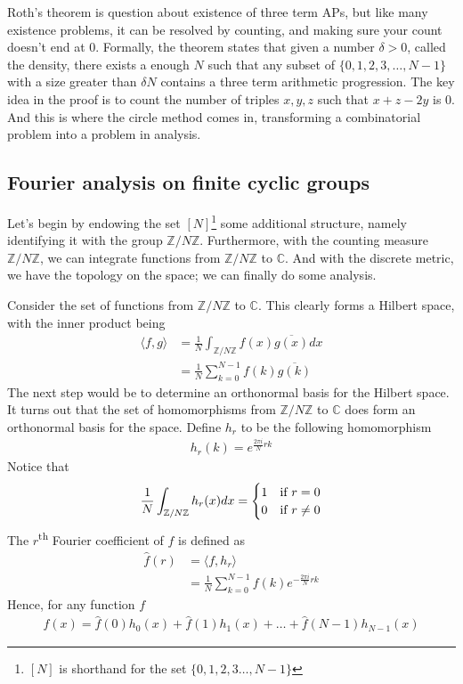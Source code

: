 \documentclass[12pt, titlepage]{article}
\theoremstyle{definition}
\newcommand{\znz}{\mathbb{Z}/N\mathbb{Z}}
\newcommand{\iprod}[2]{\langle #1, #2 \rangle}
\begin{document}
Roth's theorem is question about existence of three term APs, but like many existence problems, it can be resolved by counting, and making sure your count doesn't end at $0$. Formally, the theorem states that given a number $\delta > 0$, called the density, there exists a enough $N$ such that any subset of $\{0,1, 2, 3, \ldots, N-1\}$ with a size greater than $\delta N$ contains a  three term arithmetic progression.  The key idea in the proof is to count the number of triples $x,y,z$ such that $x+z-2y$ is $0$. And this is where the circle method comes in, transforming a combinatorial problem into a problem in analysis.

\subsection{Fourier analysis on finite cyclic groups}
Let's begin by endowing the set $[N]$\footnote{$[N]$ is shorthand for the set $\{0,1, 2,3 \ldots, N-1\}$} some additional structure, namely identifying it with the group $\znz$. Furthermore, with the counting measure $\znz$, we can integrate functions from $\znz$ to $\mathbb{C}$. And with the discrete metric, we have the topology on the space; we can finally do some analysis.

Consider the set of functions from $\znz$ to $\mathbb{C}$. This clearly forms a Hilbert space, with the inner product being
\begin{align*}
   \iprod{f}{g} &= \frac{1}{N} \int_{\znz} f(x) \overline{g(x)} dx \\
   &= \frac{1}{N} \sum_{k=0}^{N-1} f(k) \overline{g(k)}
\end{align*}
The next step would be to determine an orthonormal basis for the Hilbert space. It turns out that the set of homomorphisms from $\znz$ to $\mathbb{C}$ does form an orthonormal basis for the space. Define $h_r$ to be the following homomorphism
\begin{align*}
    h_r(k) = e^{\frac{2\pi i}{N}rk}
\end{align*}
Notice that
\begin{align*}
    \frac{1}{N}\int_{\znz} h_r(x) dx =
    \begin{cases}
        1 \hfill &\text{if $r=0$} \\
        0 \hfill &\text{if $r \neq 0$}
    \end{cases}
\end{align*}
The $r$\textsuperscript{th} Fourier coefficient of $f$ is defined as
\begin{align*}
    \widehat{f}(r) &= \iprod{f}{h_r}\\ 
    &= \frac{1}{N} \sum_{k=0}^{N-1} f(k) e^{-\frac{2\pi i}{N}rk} 
\end{align*}
Hence, for any function $f$
\begin{align*}
    f(x) = \widehat{f}(0) h_0(x) + \widehat{f}(1) h_1(x) + \ldots + \widehat{f}(N-1) h_{N-1}(x)
\end{align*}
\end{document}
